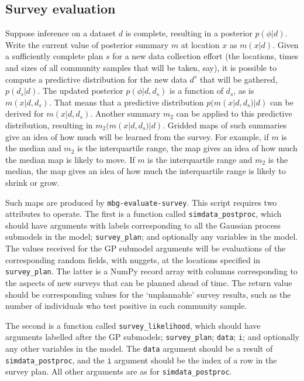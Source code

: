 \subsection{Survey evaluation}
\label{sub:survey-eval} 
Suppose inference on a dataset $d$ is complete, resulting in a posterior $p(\phi|d)$. Write the current value of posterior summary $m$ at location $x$ as $m(x|d)$. Given a sufficiently complete plan $s$ for a new data collection effort (the locations, times and sizes of all community samples that will be taken, say), it is possible to compute a predictive distribution for the new data $d^s$ that will be gathered, $p(d_s|d)$. The updated posterior $p(\phi|d,d_s)$ is a function of $d_s$, as is $m(x|d,d_s)$. That means that a predictive distribution $p(m(x|d,d_s)|d)$ can be derived for $m(x|d,d_s)$.
Another summary $m_2$ can be applied to this predictive distribution, resulting in $m_2(m(x|d,d_s)|d)$. Gridded maps of such summaries give an idea of how much will be learned from the survey. For example, if $m$ is the median and $m_2$ is the interquartile range, the map gives an idea of how much the median map is likely to move. If $m$ is the interquartile range and $m_2$ is the median, the map gives an idea of how much the interquartile range is likely to shrink or grow. 

Such maps are produced by \texttt{mbg-evaluate-survey}. This script requires two attributes to operate. The first is a function called \texttt{simdata\_postproc}, which should have arguments with labels corresponding to all the Gaussian process submodels in the model; \texttt{survey\_plan}; and optionally any variables in the model. The values received for the GP submodel arguments will be evaluations of the corresponding random fields, with nuggets, at the locations specified in \texttt{survey\_plan}. The latter is a NumPy record array with columns corresponding to the aspects of new surveys that can be planned ahead of time. The return value should be corresponding values for the `unplannable' survey results, such as the number of individuals who test positive in each community sample.

The second is a function called \texttt{survey\_likelihood}, which should have arguments labelled after the GP submodels; \texttt{survey\_plan}; \texttt{data}; \texttt{i}; and optionally any other variables in the model. The \texttt{data} argument should be a result of \texttt{simdata\_postproc}, and the \texttt{i} argument should be the index of a row in the survey plan. All other arguments are as for \texttt{simdata\_postproc}.

